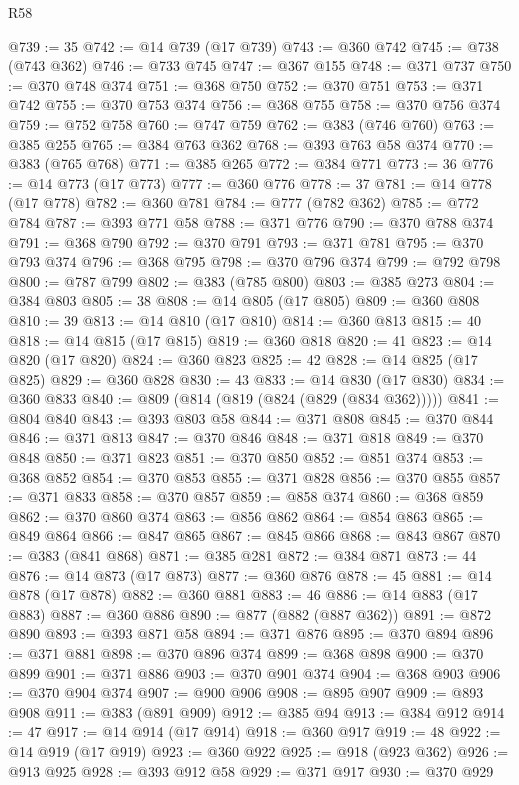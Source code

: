 \begin{lexlean}{R58}
\begin{coremodule}
@739 := 35
@742 := @14 @739 (@17 @739)
@743 := @360 @742
@745 := @738 (@743 @362)
@746 := @733 @745
@747 := @367 @155
@748 := @371 @737
@750 := @370 @748 @374
@751 := @368 @750
@752 := @370 @751
@753 := @371 @742
@755 := @370 @753 @374
@756 := @368 @755
@758 := @370 @756 @374
@759 := @752 @758
@760 := @747 @759
@762 := @383 (@746 @760)
@763 := @385 @255
@765 := @384 @763 @362
@768 := @393 @763 @58 @374
@770 := @383 (@765 @768)
@771 := @385 @265
@772 := @384 @771
@773 := 36
@776 := @14 @773 (@17 @773)
@777 := @360 @776
@778 := 37
@781 := @14 @778 (@17 @778)
@782 := @360 @781
@784 := @777 (@782 @362)
@785 := @772 @784
@787 := @393 @771 @58
@788 := @371 @776
@790 := @370 @788 @374
@791 := @368 @790
@792 := @370 @791
@793 := @371 @781
@795 := @370 @793 @374
@796 := @368 @795
@798 := @370 @796 @374
@799 := @792 @798
@800 := @787 @799
@802 := @383 (@785 @800)
@803 := @385 @273
@804 := @384 @803
@805 := 38
@808 := @14 @805 (@17 @805)
@809 := @360 @808
@810 := 39
@813 := @14 @810 (@17 @810)
@814 := @360 @813
@815 := 40
@818 := @14 @815 (@17 @815)
@819 := @360 @818
@820 := 41
@823 := @14 @820 (@17 @820)
@824 := @360 @823
@825 := 42
@828 := @14 @825 (@17 @825)
@829 := @360 @828
@830 := 43
@833 := @14 @830 (@17 @830)
@834 := @360 @833
@840 := @809 (@814 (@819 (@824 (@829 (@834 @362)))))
@841 := @804 @840
@843 := @393 @803 @58
@844 := @371 @808
@845 := @370 @844
@846 := @371 @813
@847 := @370 @846
@848 := @371 @818
@849 := @370 @848
@850 := @371 @823
@851 := @370 @850
@852 := @851 @374
@853 := @368 @852
@854 := @370 @853
@855 := @371 @828
@856 := @370 @855
@857 := @371 @833
@858 := @370 @857
@859 := @858 @374
@860 := @368 @859
@862 := @370 @860 @374
@863 := @856 @862
@864 := @854 @863
@865 := @849 @864
@866 := @847 @865
@867 := @845 @866
@868 := @843 @867
@870 := @383 (@841 @868)
@871 := @385 @281
@872 := @384 @871
@873 := 44
@876 := @14 @873 (@17 @873)
@877 := @360 @876
@878 := 45
@881 := @14 @878 (@17 @878)
@882 := @360 @881
@883 := 46
@886 := @14 @883 (@17 @883)
@887 := @360 @886
@890 := @877 (@882 (@887 @362))
@891 := @872 @890
@893 := @393 @871 @58
@894 := @371 @876
@895 := @370 @894
@896 := @371 @881
@898 := @370 @896 @374
@899 := @368 @898
@900 := @370 @899
@901 := @371 @886
@903 := @370 @901 @374
@904 := @368 @903
@906 := @370 @904 @374
@907 := @900 @906
@908 := @895 @907
@909 := @893 @908
@911 := @383 (@891 @909)
@912 := @385 @94
@913 := @384 @912
@914 := 47
@917 := @14 @914 (@17 @914)
@918 := @360 @917
@919 := 48
@922 := @14 @919 (@17 @919)
@923 := @360 @922
@925 := @918 (@923 @362)
@926 := @913 @925
@928 := @393 @912 @58
@929 := @371 @917
@930 := @370 @929

\end{coremodule}
\end{lexlean}
